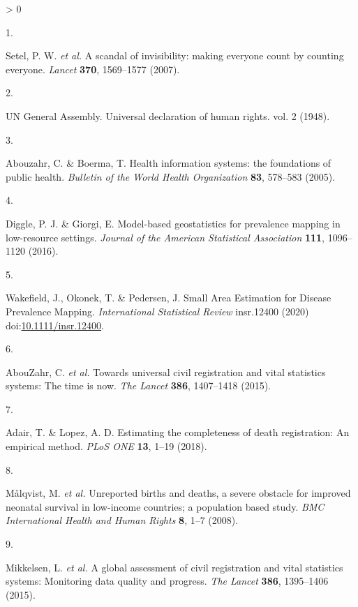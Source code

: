 \documentclass[
]{article}
\newlength{\cslhangindent}
\newlength{\csllabelwidth}
\newenvironment{CSLReferences}[2] %
 {%
  \setlength{\parindent}{0pt}
  \ifodd #1 \everypar{\setlength{\hangindent}{\cslhangindent}}\ignorespaces\fi
  \ifnum #2 > 0
  \setlength{\parskip}{#2\baselineskip}
  \fi
 }%
 {}
\newcommand{\CSLLeftMargin}[1]{\parbox[t]{\csllabelwidth}{#1}}
\newcommand{\CSLRightInline}[1]{\parbox[t]{\linewidth - \csllabelwidth}{#1}\break}
\begin{document}
\hypertarget{refs}{}
\begin{CSLReferences}{0}{0}
\leavevmode\hypertarget{ref-Setel2007}{}%
\CSLLeftMargin{1. }
\CSLRightInline{Setel, P. W. \emph{et al.} {A scandal of invisibility: making everyone count by counting everyone}. \emph{Lancet} \textbf{370}, 1569--1577 (2007).}

\leavevmode\hypertarget{ref-srs}{}%
\CSLLeftMargin{2. }
\CSLRightInline{UN General Assembly. {Universal declaration of human rights}. vol. 2 (1948).}

\leavevmode\hypertarget{ref-Abouzahr2005}{}%
\CSLLeftMargin{3. }
\CSLRightInline{Abouzahr, C. \& Boerma, T. {Health information systems: the foundations of public health}. \emph{Bulletin of the World Health Organization} \textbf{83}, 578--583 (2005).}

\leavevmode\hypertarget{ref-Diggle2016}{}%
\CSLLeftMargin{4. }
\CSLRightInline{Diggle, P. J. \& Giorgi, E. {Model-based geostatistics for prevalence mapping in low-resource settings}. \emph{Journal of the American Statistical Association} \textbf{111}, 1096--1120 (2016).}

\leavevmode\hypertarget{ref-Wakefield2020}{}%
\CSLLeftMargin{5. }
\CSLRightInline{Wakefield, J., Okonek, T. \& Pedersen, J. {Small Area Estimation for Disease Prevalence Mapping}. \emph{International Statistical Review} insr.12400 (2020) doi:\href{https://doi.org/10.1111/insr.12400}{10.1111/insr.12400}.}

\leavevmode\hypertarget{ref-AbouZahr2015}{}%
\CSLLeftMargin{6. }
\CSLRightInline{AbouZahr, C. \emph{et al.} {Towards universal civil registration and vital statistics systems: The time is now}. \emph{The Lancet} \textbf{386}, 1407--1418 (2015).}

\leavevmode\hypertarget{ref-Adair2018}{}%
\CSLLeftMargin{7. }
\CSLRightInline{Adair, T. \& Lopez, A. D. {Estimating the completeness of death registration: An empirical method}. \emph{PLoS ONE} \textbf{13}, 1--19 (2018).}

\leavevmode\hypertarget{ref-Malqvist2008}{}%
\CSLLeftMargin{8. }
\CSLRightInline{Målqvist, M. \emph{et al.} {Unreported births and deaths, a severe obstacle for improved neonatal survival in low-income countries; a population based study}. \emph{BMC International Health and Human Rights} \textbf{8}, 1--7 (2008).}

\leavevmode\hypertarget{ref-Mikkelsen2015}{}%
\CSLLeftMargin{9. }
\CSLRightInline{Mikkelsen, L. \emph{et al.} {A global assessment of civil registration and vital statistics systems: Monitoring data quality and progress}. \emph{The Lancet} \textbf{386}, 1395--1406 (2015).}


\end{CSLReferences}
\end{document}
